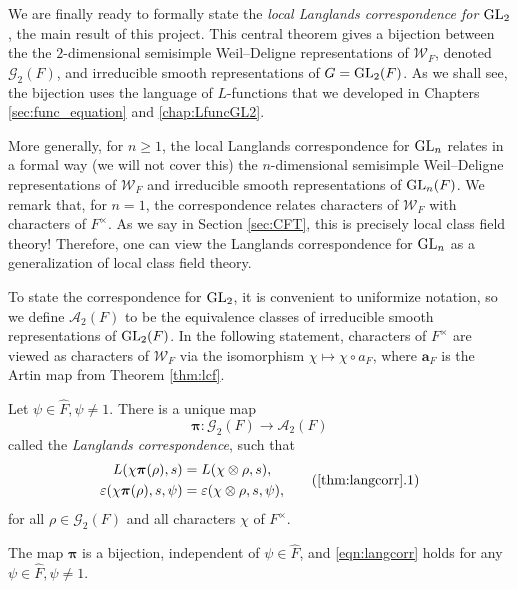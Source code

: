 We are finally ready to formally state the \textit{local Langlands correspondence for $\mathrm{GL}_2$}, the main result of this project. This central theorem gives a bijection between the the $2$-dimensional semisimple Weil--Deligne representations of $\mathcal{W}_F$, denoted $\mathcal{G}_2(F)$, and irreducible smooth representations of $G=\mathrm{GL}_2(F)$. As we shall see, the bijection uses the language of $L$-functions that we developed in Chapters \ref{sec:func_equation} and \ref{chap:LfuncGL2}. 

More generally, for $n\geq 1$, the local Langlands correspondence for $\mathrm{GL}_n$ relates in a formal way (we will not cover this) the $n$-dimensional semisimple Weil--Deligne representations of $\mathcal{W}_F$ and irreducible smooth representations of $\mathrm{GL}_n(F)$. We remark that, for $n=1$, the correspondence relates characters of $\mathcal{W}_F$ with characters of $F^\times$. As we say in Section \ref{sec:CFT}, this is precisely local class field theory! Therefore, one can view the Langlands correspondence for $\mathrm{GL}_n$ as a generalization of local class field theory.

To state the correspondence for $\mathrm{GL}_2$, it is convenient to uniformize notation, so we define $\mathcal{A}_2(F)$ to be the equivalence classes of irreducible smooth representations of $\mathrm{GL}_2(F)$. In the following statement, characters of $F^\times$ are viewed as characters of $\mathcal{W}_F$ via the isomorphism $\chi\mapsto\chi\circ a_F$, where $\mathbf{a}_F$ is the Artin map from Theorem \ref{thm:lcf}.


\begin{thm}\label{thm:langcorr}
    Let $\psi\in\hat{F},\psi\neq 1$. There is a unique map 
    $$\bm\pi:\mathcal{G}_2(F)\longrightarrow\mathcal{A}_2(F)$$
    called the \textit{Langlands correspondence}, such that 
    \begin{equation}
        \begin{split}
            L(\chi\bm\pi(\rho),s)&=L(\chi\otimes\rho,s),\\
            \varepsilon(\chi\bm\pi(\rho),s,\psi)&=\varepsilon(\chi\otimes\rho,s,\psi),
        \end{split}
        \label{eqn:langcorr}\tag{\ref{thm:langcorr}.1}
    \end{equation}
    for all $\rho\in\mathcal{G}_2(F)$ and all characters $\chi$ of $F^\times$.

    The map $\bm\pi$ is a bijection, independent of $\psi\in\hat{F}$, and \eqref{eqn:langcorr} holds for any $\psi\in\hat{F}, \psi\neq1$.
\end{thm}

